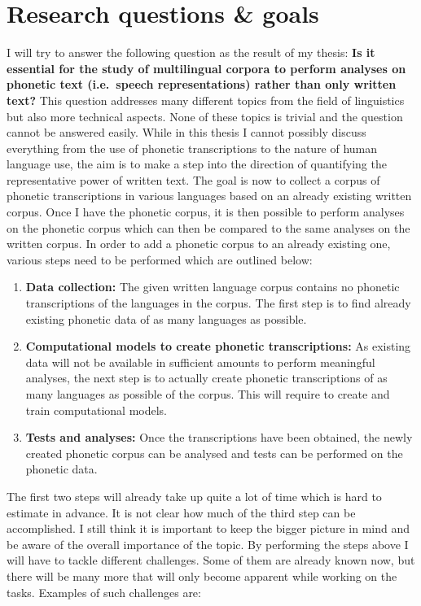 \section{Research questions \& goals}
I will try to answer the following question as the result of my thesis: \textbf{Is it essential for the study of multilingual corpora to perform analyses on phonetic text (i.e.\ speech representations) rather than only written text?} This question addresses many different topics from the field of linguistics but also more technical aspects. None of these topics is trivial and the question cannot be answered easily. While in this thesis I cannot possibly discuss everything from the use of phonetic transcriptions to the nature of human language use, the aim is to make a step into the direction of quantifying the representative power of written text. The goal is now to collect a corpus of phonetic transcriptions in various languages based on an already existing written corpus. Once I have the phonetic corpus, it is then possible to perform analyses on the phonetic corpus which can then be compared to the same analyses on the written corpus. In order to add a phonetic corpus to an already existing one, various steps need to be performed which are outlined below:
\begin{enumerate}
 \item \textbf{Data collection:} The given written language corpus contains no phonetic transcriptions of the languages in the corpus. The first step is to find already existing phonetic data of as many languages as possible. 
 \item \textbf{Computational models to create phonetic transcriptions:} As existing data will not be available in sufficient amounts to perform meaningful analyses, the next step is to actually create phonetic transcriptions of as many languages as possible of the corpus. This will require to create and train computational models.
 \item \textbf{Tests and analyses:} Once the transcriptions have been obtained, the newly created phonetic corpus can be analysed and tests can be performed on the phonetic data.
\end{enumerate}

The first two steps will already take up quite a lot of time which is hard to estimate in advance. It is not clear how much of the third step can be accomplished. I still think it is important to keep the bigger picture in mind and be aware of the overall importance of the topic. By performing the steps above I will have to tackle different challenges. Some of them are already known now, but there will be many more that will only become apparent while working on the tasks. Examples of such challenges are:

